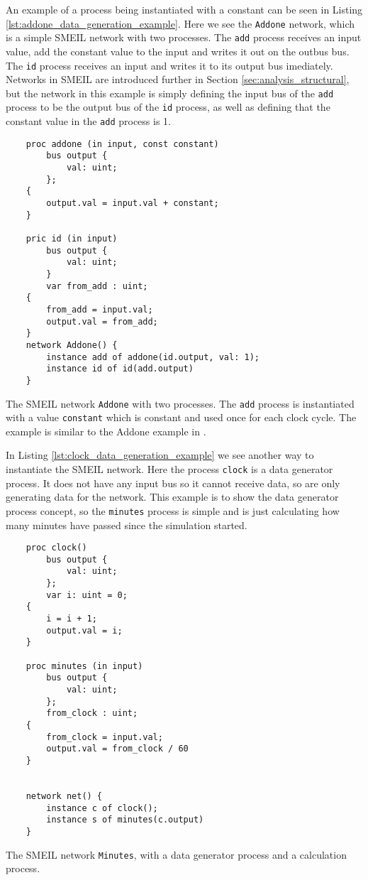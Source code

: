 An example of a process being instantiated with a constant can be seen in Listing \ref{lst:addone_data_generation_example}. Here we see the \texttt{Addone} network, which is a simple SMEIL network with two processes. The \texttt{add} process receives an input value, add the constant value to the input and writes it out on the outbus bus. The \texttt{id} process receives an input and writes it to its output bus imediately. Networks in SMEIL are introduced further in Section \ref{sec:analysis_structural}, but the network in this example is simply defining the input bus of the \texttt{add} process to be the output bus of the \texttt{id} process, as well as defining that the constant value in the \texttt{add} process is 1.

\begin{listing}
    \begin{verbatim}
    proc addone (in input, const constant)
        bus output {
            val: uint;
        };
    {
        output.val = input.val + constant;
    }

    pric id (in input)
        bus output {
            val: uint;
        }
        var from_add : uint;
    {
        from_add = input.val;
        output.val = from_add;
    }
    network Addone() {
        instance add of addone(id.output, val: 1);
        instance id of id(add.output)
    }
    \end{verbatim}
    \caption{The SMEIL network \texttt{Addone} with two processes. The \texttt{add} process is instantiated with a value \texttt{constant} which is constant and used once for each clock cycle. The example is similar to the Addone example in \cite{smeil}.}
    \label{lst:addone_data_generation_example}
\end{listing}


In Listing \ref{lst:clock_data_generation_example} we see another way to instantiate the SMEIL network. Here the process \texttt{clock} is a data generator process. It does not have any input bus so it cannot receive data, so are only generating data for the network. This example is to show the data generator process concept, so the \texttt{minutes} process is simple and is just calculating how many minutes have passed since the simulation started.
\begin{listing}
    \begin{verbatim}
    proc clock()
        bus output {
            val: uint;
        };
        var i: uint = 0;
    {
        i = i + 1;
        output.val = i;
    }

    proc minutes (in input)
        bus output {
            val: uint;
        };
        from_clock : uint;
    {
        from_clock = input.val;
        output.val = from_clock / 60
    }


    network net() {
        instance c of clock();
        instance s of minutes(c.output)
    }
    \end{verbatim}
    \caption{The SMEIL network \texttt{Minutes}, with a data generator process and a calculation process.}
    \label{lst:clock_data_generation_example}
\end{listing}

